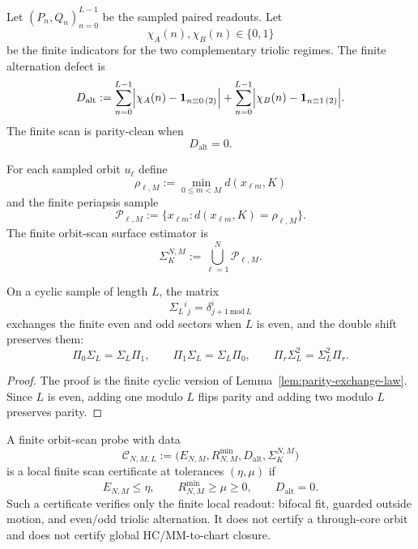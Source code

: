 \begin{definition}
\label{def:finite-parity-triolic-indicators}
Let $(P_n,Q_n)_{n=0}^{L-1}$ be the sampled paired readouts.  Let
\[
\chi_A(n),\chi_B(n)\in\{0,1\}
\]
be the finite indicators for the two complementary triolic regimes.  The finite alternation defect is
\[
D_{\mathrm{alt}}
:=
\sum_{n=0}^{L-1}
\Bigl|\chi_A(n)-\mathbf 1_{n\equiv0\, (2)}\Bigr|
+
\sum_{n=0}^{L-1}
\Bigl|\chi_B(n)-\mathbf 1_{n\equiv1\, (2)}\Bigr| .
\]
The finite scan is parity-clean when
\[
D_{\mathrm{alt}}=0.
\]
\end{definition}

\begin{definition}
\label{def:finite-periapsis-estimator}
For each sampled orbit $u_\ell$ define
\[
\rho_{\ell,M}:=\min_{0\leq m<M} d(x_{\ell m},K)
\]
and the finite periapsis sample
\[
\mathcal P_{\ell,M}
:=
\{x_{\ell m}:d(x_{\ell m},K)=\rho_{\ell,M}\}.
\]
The finite orbit-scan surface estimator is
\[
\Sigma_{K}^{N,M}
:=
\bigcup_{\ell=1}^{N}\mathcal P_{\ell,M}.
\]
\end{definition}

\begin{lemma}
\label{lem:finite-shift-selector-audit}
On a cyclic sample of length $L$, the matrix
\[
\Sigma_L{}^i{}_j=\delta^i_{j+1\,\mathrm{mod}\,L}
\]
exchanges the finite even and odd sectors when $L$ is even, and the double shift preserves them:
\[
\Pi_0\Sigma_L=\Sigma_L\Pi_1,
\qquad
\Pi_1\Sigma_L=\Sigma_L\Pi_0,
\qquad
\Pi_r\Sigma_L^2=\Sigma_L^2\Pi_r.
\]
\end{lemma}

\begin{proof}
The proof is the finite cyclic version of Lemma~\ref{lem:parity-exchange-law}.  Since $L$ is even, adding one modulo $L$ flips parity and adding two modulo $L$ preserves parity.
\end{proof}

\begin{proposition}
\label{prop:finite-probe-certificate}
A finite orbit-scan probe with data
\[
\mathcal C_{N,M,L}
:=
\bigl(E_{N,M},R_{N,M}^{\min},D_{\mathrm{alt}},\Sigma_{K}^{N,M}\bigr)
\]
is a local finite scan certificate at tolerances $(\eta,\mu)$ if
\[
E_{N,M}\leq\eta,
\qquad
R_{N,M}^{\min}\geq\mu\geq0,
\qquad
D_{\mathrm{alt}}=0.
\]
Such a certificate verifies only the finite local readout: bifocal fit, guarded outside motion, and even/odd triolic alternation.  It does not certify a through-core orbit and does not certify global HC/MM-to-chart closure.
\end{proposition}

